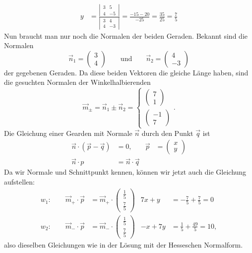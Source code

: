\begin{loesung}
\begin{align*}
y&=\frac{\left|\,\begin{matrix}3&5\\4&-5\end{matrix}\,\right|}{\left|\,\begin{matrix}3&4\\4&-3\end{matrix}\,\right|}
=\frac{-15-20}{-25}=\frac{35}{25}=\frac75
\end{align*}
Nun braucht man nur noch die Normalen der beiden Geraden. Bekannt sind die Normalen
\[
\vec n_1=\begin{pmatrix}3\\4\end{pmatrix}
\qquad
\text{und}
\qquad
\vec n_2=\begin{pmatrix}4\\-3\end{pmatrix}
\]
der gegebenen Geraden. Da diese beiden Vektoren die gleiche Länge haben,
sind die gesuchten Normalen der Winkelhalbierenden
\[
\vec m_{\pm}=\vec n_1\pm \vec n_2=\begin{cases}
\begin{pmatrix}7\\1\end{pmatrix}\\
\begin{pmatrix}-1\\7\end{pmatrix}
\end{cases}.
\]
Die Gleichung einer Gearden mit Normale $\vec n$ durch den Punkt $\vec q$ ist
\begin{align*}
\vec n\cdot(\vec p-\vec q)&=0,&\vec p&=\begin{pmatrix}x\\y\end{pmatrix}
\\
\vec n\cdot p&=\vec n\cdot\vec q
\end{align*}
Da wir Normale und Schnittpunkt kennen, können wir jetzt auch die Gleichung
aufstellen:
\begin{align*}
w_1:\qquad \vec m_+\cdot\vec p&=\vec m_+\cdot\begin{pmatrix}\frac15\\\frac75\end{pmatrix}&
   7x+y&=-\frac75+\frac{7}5=0
\\
w_2:\qquad\vec m_-\cdot\vec p&=\vec m_-\cdot\begin{pmatrix}\frac15\\\frac75\end{pmatrix}&
   -x+7y&=\frac15+\frac{49}5=10,
\end{align*}
also dieselben Gleichungen wie in der Lösung mit der Hesseschen Normalform.


\end{loesung}
